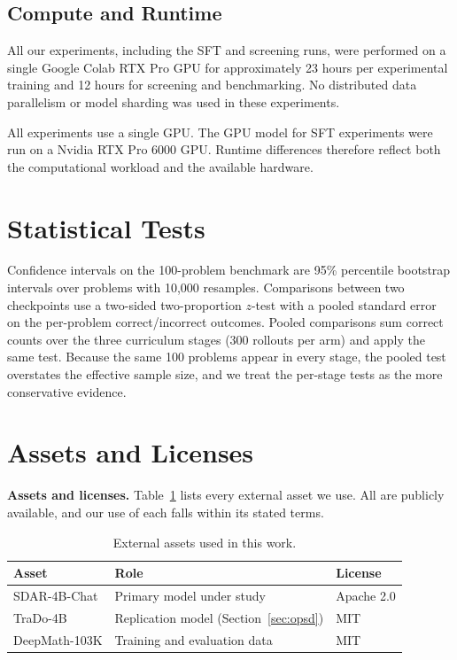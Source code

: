 \documentclass{article}
\begin{document}
\subsection{Compute and Runtime}
\label{app:compute}

All our experiments, including the SFT and screening runs, were performed on a single Google Colab RTX Pro GPU for approximately 23 hours per experimental training and 12 hours for screening and benchmarking. No distributed data parallelism or model sharding was used in these experiments.

All experiments use a single GPU. The GPU model for SFT experiments were run on a Nvidia RTX Pro 6000 GPU. Runtime differences therefore reflect both the computational
workload and the available hardware.

\section{Statistical Tests}
\label{app:stats}

Confidence intervals on the 100-problem benchmark are 95\% percentile bootstrap intervals over problems with 10,000 resamples. Comparisons between two checkpoints use a two-sided two-proportion $z$-test with a pooled standard error on the per-problem correct/incorrect outcomes. Pooled comparisons sum correct counts over the three curriculum stages (300 rollouts per arm) and apply the same test. Because the same 100 problems appear in every stage, the pooled test overstates the effective sample size, and we treat the per-stage tests as the more conservative evidence.

\section{Assets and Licenses}
\label{sec:appendix-assets}

\textbf{Assets and licenses.} Table~\ref{tab:assets} lists every external asset we use. All are publicly available, and our use of each falls within its stated terms.

\begin{table}[H]
  \caption{External assets used in this work.}
  \label{tab:assets}
  \centering
  \small
  \begin{tabular}{lll}
    \toprule
    Asset & Role & License \\
    \midrule
    SDAR-4B-Chat \citep{cheng2025sdar}     & Primary model under study        & Apache 2.0 \\
    TraDo-4B \citep{wang2025tracerl}       & Replication model (Section~\ref{sec:opsd}) & MIT \\
    DeepMath-103K \citep{he2025deepmath}   & Training and evaluation data     & MIT \\
    \bottomrule
  \end{tabular}
\end{table}
\end{document}
